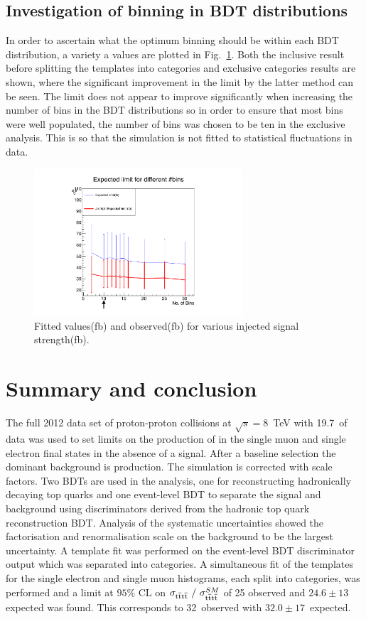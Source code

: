 \subsection{Investigation of binning in BDT distributions \label{appsub:binning}}

In order to ascertain what the optimum binning should be within each BDT distribution, a variety a values are plotted in Fig.~\ref{fig:Binning}. Both the inclusive result before splitting the templates into \njets categories and exclusive \njets categories results are shown, where the significant improvement in the limit by the latter method can be seen. The limit does not appear to improve significantly when increasing the number of bins in the BDT distributions so in order to ensure that most bins were well populated, the number of bins was chosen to be ten in the exclusive analysis. This is so that the simulation is not fitted to statistical fluctuations in data.

\begin{figure}[ht!]
\centering
    \includegraphics[width=0.69\textwidth]{images/Run1/BinningPrint.pdf}
    \caption{Fitted values(fb) and observed(fb) for various injected signal strength(fb).}
    \label{fig:Binning}
\end{figure}

\section{Summary and conclusion}
\label{sec:summary8}
The full 2012 data set of proton-proton collisions at $\sqrt{s}=8$~TeV with 19.7~\fbinv of data was used to set limits on the production of \tttt in the single muon and single electron final states in the absence of a signal. After a baseline selection the dominant background is \ttbar production. The simulation is corrected with scale factors. Two BDTs are used in the analysis, one for reconstructing hadronically decaying top quarks and one event-level BDT to separate the signal and background using discriminators derived from the hadronic top quark reconstruction BDT. Analysis of the systematic uncertainties showed the factorisation and renormalisation scale on the \ttbar background to be the largest uncertainty. A template fit was performed on the event-level BDT discriminator output which was separated into \njets categories. A simultaneous fit of the templates for the single electron and single muon histograms, each split into \njets categories, was performed and a \CLS limit at $95\%$ CL on $\sigma_{{\mathrm{t}\overline{\mathrm{t}}\mathrm{t}\overline{\mathrm{t}}}}~/~\sigma_{{\mathrm{t}\overline{\mathrm{t}}\mathrm{t}\overline{\mathrm{t}}}}^{SM} $ of 25 observed and $24.6\pm13$ expected was found. This corresponds to 32~\fb observed with $32.0\pm17$~\fb expected.


